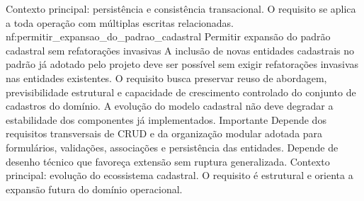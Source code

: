 {Contexto principal: persistência e consistência transacional. O requisito se aplica a toda operação com múltiplas escritas relacionadas.}
\reqfuncfull
{nf:permitir_expansao_do_padrao_cadastral}
{Permitir expansão do padrão cadastral sem refatorações invasivas}
{A inclusão de novas entidades cadastrais no padrão já adotado pelo projeto deve ser possível sem exigir refatorações invasivas nas entidades existentes. O requisito busca preservar reuso de abordagem, previsibilidade estrutural e capacidade de crescimento controlado do conjunto de cadastros do domínio. A evolução do modelo cadastral não deve degradar a estabilidade dos componentes já implementados.}
{Importante}
{Depende dos requisitos transversais de CRUD e da organização modular adotada para formulários, validações, associações e persistência das entidades. Depende de desenho técnico que favoreça extensão sem ruptura generalizada.}
{Contexto principal: evolução do ecossistema cadastral. O requisito é estrutural e orienta a expansão futura do domínio operacional.}